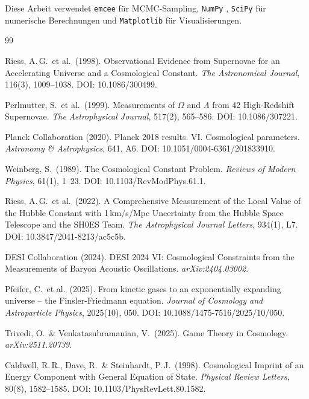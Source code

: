 \documentclass[aps,prd,twocolumn,superscriptaddress,nofootinbib]{revtex4-2}
\begin{document}
Diese Arbeit verwendet \texttt{emcee} \cite{ForemanMackey2013} f\"ur MCMC-Sampling, \texttt{NumPy} \cite{Harris2020}, \texttt{SciPy} \cite{Virtanen2020} f\"ur numerische Berechnungen und \texttt{Matplotlib} \cite{Hunter2007} f\"ur Visualisierungen.

\begin{thebibliography}{99}

Riess, A.\,G.\ et al.\ (1998).
Observational Evidence from Supernovae for an Accelerating Universe and a Cosmological Constant.
\textit{The Astronomical Journal}, 116(3), 1009--1038.
DOI: 10.1086/300499.

Perlmutter, S.\ et al.\ (1999).
Measurements of $\Omega$ and $\Lambda$ from 42 High-Redshift Supernovae.
\textit{The Astrophysical Journal}, 517(2), 565--586.
DOI: 10.1086/307221.

Planck Collaboration (2020).
Planck 2018 results. VI. Cosmological parameters.
\textit{Astronomy \& Astrophysics}, 641, A6.
DOI: 10.1051/0004-6361/201833910.

Weinberg, S.\ (1989).
The Cosmological Constant Problem.
\textit{Reviews of Modern Physics}, 61(1), 1--23.
DOI: 10.1103/RevModPhys.61.1.

Riess, A.\,G.\ et al.\ (2022).
A Comprehensive Measurement of the Local Value of the Hubble Constant with 1\,km/s/Mpc Uncertainty from the Hubble Space Telescope and the SH0ES Team.
\textit{The Astrophysical Journal Letters}, 934(1), L7.
DOI: 10.3847/2041-8213/ac5c5b.

DESI Collaboration (2024).
DESI 2024 VI: Cosmological Constraints from the Measurements of Baryon Acoustic Oscillations.
\textit{arXiv:2404.03002}.

Pfeifer, C.\ et al.\ (2025).
From kinetic gases to an exponentially expanding universe -- the Finsler-Friedmann equation.
\textit{Journal of Cosmology and Astroparticle Physics}, 2025(10), 050.
DOI: 10.1088/1475-7516/2025/10/050.

Trivedi, O.\ \& Venkatasubramanian, V.\ (2025).
Game Theory in Cosmology.
\textit{arXiv:2511.20739}.

Caldwell, R.\,R., Dave, R.\ \& Steinhardt, P.\,J.\ (1998).
Cosmological Imprint of an Energy Component with General Equation of State.
\textit{Physical Review Letters}, 80(8), 1582--1585.
DOI: 10.1103/PhysRevLett.80.1582.


\end{thebibliography}
\end{document}

